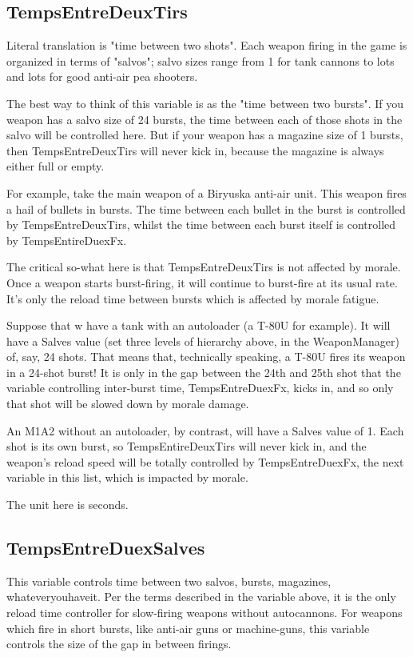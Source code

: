 \documentclass{article}
\begin{document}
\subsection{TempsEntreDeuxTirs}

Literal translation is "time between two shots". Each weapon firing in the game is organized in terms of "salvos"; salvo sizes range from 1 for tank cannons to lots and lots for good anti-air pea shooters.

The best way to think of this variable is as the "time between two bursts". If you weapon has a salvo size of 24 bursts, the time between each of those shots in the salvo will be controlled here. But if your weapon has a magazine size of 1 bursts, then TempsEntreDeuxTirs will never kick in, because the magazine is always either full or empty.

For example, take the main weapon of a Biryuska anti-air unit. This weapon fires a hail of bullets in bursts. The time between each bullet in the burst is controlled by TempsEntreDeuxTirs, whilst the time between each burst itself is controlled by TempsEntireDuexFx.

The critical so-what here is that TempsEntreDeuxTirs is not affected by morale. Once a weapon starts burst-firing, it will continue to burst-fire at its usual rate. It's only the reload time between bursts which is affected by morale fatigue.

Suppose that w have a tank with an autoloader (a T-80U for example). It will have a Salves value (set three levels of hierarchy above, in the WeaponManager) of, say, 24 shots. That means that, technically speaking, a T-80U fires its weapon in a 24-shot burst! It is only in the gap between the 24th and 25th shot that the variable controlling inter-burst time, TempsEntreDuexFx, kicks in, and so only that shot will be slowed down by morale damage.

An M1A2 without an autoloader, by contrast, will have a Salves value of 1. Each shot is its own burst, so TempsEntireDeuxTirs will never kick in, and the weapon's reload speed will be totally controlled by TempsEntreDuexFx, the next variable in this list, which is impacted by morale.

The unit here is seconds.

\subsection{TempsEntreDuexSalves}

This variable controls time between two salvos, bursts, magazines, whateveryouhaveit. Per the terms described in the variable above, it is the only reload time controller for slow-firing weapons without autocannons. For weapons which fire in short bursts, like anti-air guns or machine-guns, this variable controls the size of the gap in between firings.
\end{document}
